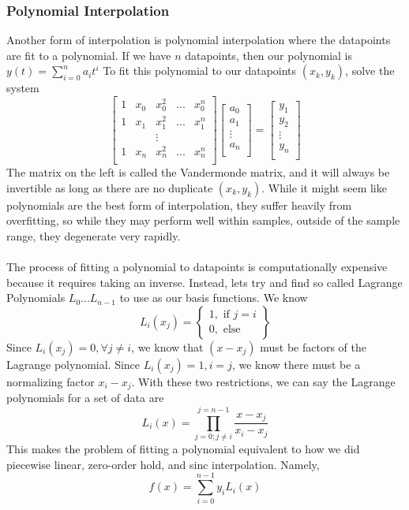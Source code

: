 \documentclass{article}
\begin{document}
\subsubsection{Polynomial Interpolation}
Another form of interpolation is polynomial interpolation where the datapoints are fit to a polynomial.
If we have $n$ datapoints, then our polynomial is $y(t) = \sum_{i=0}^{n}{a_i t^i}$
To fit this polynomial to our datapoints $(x_k, y_k)$, solve the system
\[
    \left[
        \begin{array}{ccccc}
            1 & x_0 & x_0^2 & ... & x_0^n\\
            1 & x_1 & x_1^2 & ... & x_1^n\\
            & & \vdots & &\\
            1 & x_n & x_n^2 & ... & x_n^n\\
        \end{array}
    \right]\left[
        \begin{array}{c}
            a_0\\
            a_1\\
            \vdots\\
            a_n\\
        \end{array}
    \right]=\left[
        \begin{array}{c}
            y_1\\
            y_2\\
            \vdots\\
            y_n\\
        \end{array}
    \right]
\]
The matrix on the left is called the Vandermonde matrix,
and it will always be invertible as long as there are no duplicate $(x_k, y_k)$.
While it might seem like polynomials are the best form of interpolation, they suffer heavily from
overfitting, so while they may perform well within samples, outside of the sample range, they degenerate very rapidly.
\\\\The process of fitting a polynomial to datapoints is computationally expensive because it requires taking an inverse.
Instead, lets try and find so called Lagrange Polynomials $L_0...L_{n-1}$ to use as our basis functions.
We know
\[
    L_i(x_j) = \left\{
        \begin{array}{c}
            1, \text{ if } j = i\\
            0, \text{ else}
        \end{array}
    \right\}
\]
Since $L_i(x_j) = 0,\forall j \ne i$, we know that $(x-x_j)$
must be factors of the Lagrange polynomial. Since $L_i(x_j)=1, i=j$,
we know there must be a normalizing factor $x_i-x_j$. With these two restrictions,
we can say the Lagrange polynomials for a set of data are
\[
    L_i(x) = \prod_{j=0; j\ne i}^{j=n-1}{\frac{x-x_j}{x_i-x_j}}
\]
This makes the problem of fitting a polynomial equivalent to how we did piecewise linear, zero-order hold, and sinc interpolation.
Namely,
$$f(x) = \sum_{i=0}^{n-1}{y_i L_i(x)}$$
\end{document}
